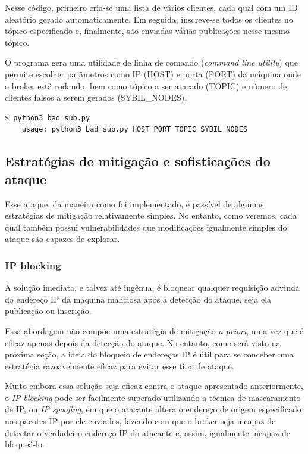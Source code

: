 Nesse código, primeiro cria-se uma lista de vários clientes, cada qual com um ID aleatório gerado automaticamente. Em seguida, inscreve-se todos os clientes no tópico especificado e, finalmente, são enviadas várias publicações nesse mesmo tópico.

O programa gera uma utilidade de linha de comando (\emph{command line utility}) que permite escolher parâmetros como IP (HOST) e porta (PORT) da máquina onde o broker está rodando, bem como tópico a ser atacado (TOPIC) e número de clientes falsos a serem gerados (SYBIL\_NODES).

\begin{lstlisting}[language=Bash, caption={Utilização da ferramenta}, label={lst:sybil}]
    $ python3 bad_sub.py
    usage: python3 bad_sub.py HOST PORT TOPIC SYBIL_NODES
\end{lstlisting}








\subsection{Estratégias de mitigação e sofisticações do ataque}

Esse ataque, da maneira como foi implementado, é passível de algumas estratégias de mitigação relativamente simples. No entanto, como veremos, cada qual também possui vulnerabilidades que modificações igualmente simples do ataque são capazes de explorar.

\subsubsection{IP blocking}

A solução imediata, e talvez até ingênua, é bloquear qualquer requisição advinda do endereço IP da máquina maliciosa após a detecção do ataque, seja ela publicação ou inscrição.

Essa abordagem não compõe uma estratégia de mitigação \emph{a priori}, uma vez que é eficaz apenas depois da detecção do ataque. No entanto, como será visto na próxima seção, a ideia do bloqueio de endereços IP é útil para se conceber uma estratégia razoavelmente eficaz para evitar esse tipo de ataque.

Muito embora essa solução seja eficaz contra o ataque apresentado anteriormente, o \emph{IP blocking} pode ser facilmente superado utilizando a técnica de mascaramento de IP, ou \emph{IP spoofing}, em que o atacante altera o endereço de origem especificado nos pacotes IP por ele enviados, fazendo com que o broker seja incapaz de detectar o verdadeiro endereço IP do atacante e, assim, igualmente incapaz de bloqueá-lo.



